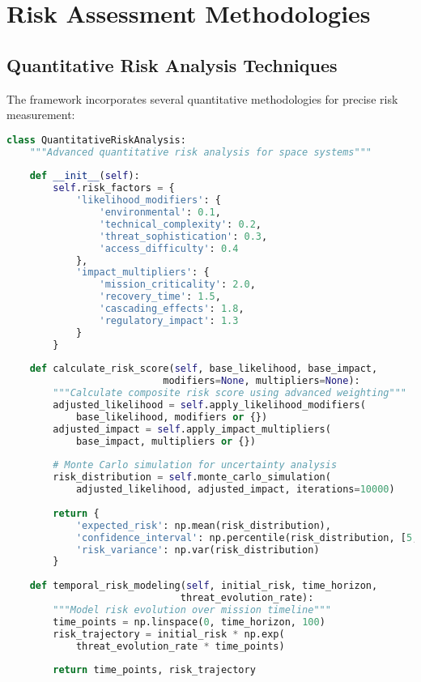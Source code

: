 \documentclass[binding=0.6cm]{sapthesis}
\begin{document}
\section{Risk Assessment Methodologies}

\subsection{Quantitative Risk Analysis Techniques}

The framework incorporates several quantitative methodologies for precise risk measurement:

\begin{lstlisting}[language=Python, caption=Quantitative Risk Calculation Framework]
class QuantitativeRiskAnalysis:
    """Advanced quantitative risk analysis for space systems"""
    
    def __init__(self):
        self.risk_factors = {
            'likelihood_modifiers': {
                'environmental': 0.1,
                'technical_complexity': 0.2,
                'threat_sophistication': 0.3,
                'access_difficulty': 0.4
            },
            'impact_multipliers': {
                'mission_criticality': 2.0,
                'recovery_time': 1.5,
                'cascading_effects': 1.8,
                'regulatory_impact': 1.3
            }
        }
    
    def calculate_risk_score(self, base_likelihood, base_impact, 
                           modifiers=None, multipliers=None):
        """Calculate composite risk score using advanced weighting"""
        adjusted_likelihood = self.apply_likelihood_modifiers(
            base_likelihood, modifiers or {})
        adjusted_impact = self.apply_impact_multipliers(
            base_impact, multipliers or {})
        
        # Monte Carlo simulation for uncertainty analysis
        risk_distribution = self.monte_carlo_simulation(
            adjusted_likelihood, adjusted_impact, iterations=10000)
        
        return {
            'expected_risk': np.mean(risk_distribution),
            'confidence_interval': np.percentile(risk_distribution, [5, 95]),
            'risk_variance': np.var(risk_distribution)
        }
    
    def temporal_risk_modeling(self, initial_risk, time_horizon, 
                              threat_evolution_rate):
        """Model risk evolution over mission timeline"""
        time_points = np.linspace(0, time_horizon, 100)
        risk_trajectory = initial_risk * np.exp(
            threat_evolution_rate * time_points)
        
        return time_points, risk_trajectory
\end{lstlisting}
\end{document}
